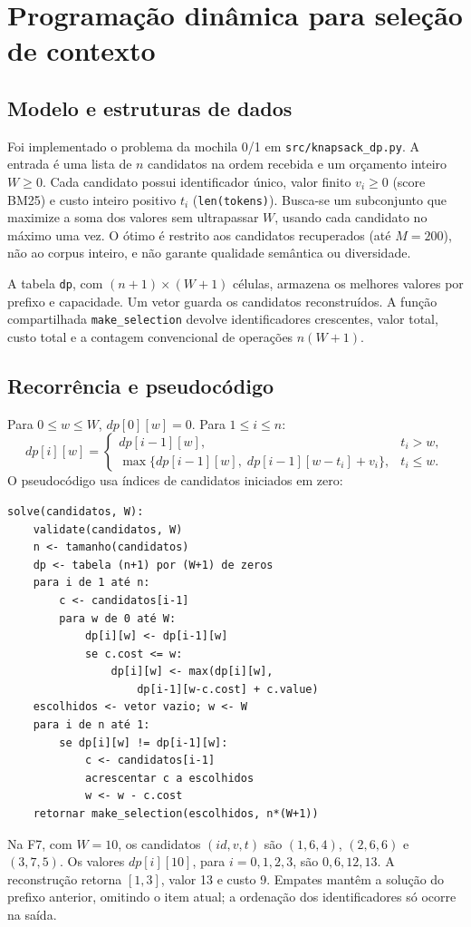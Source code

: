 \section{Programação dinâmica para seleção de contexto}

\subsection{Modelo e estruturas de dados}
Foi implementado o problema da mochila 0/1 em \texttt{src/knapsack\_dp.py}. A entrada é uma lista de $n$ candidatos na ordem recebida e um orçamento inteiro $W\geq 0$. Cada candidato possui identificador único, valor finito $v_i\geq 0$ (score BM25) e custo inteiro positivo $t_i$ (\texttt{len(tokens)}). Busca-se um subconjunto que maximize a soma dos valores sem ultrapassar $W$, usando cada candidato no máximo uma vez. O ótimo é restrito aos candidatos recuperados (até $M=200$), não ao corpus inteiro, e não garante qualidade semântica ou diversidade.

A tabela \texttt{dp}, com $(n+1)\times(W+1)$ células, armazena os melhores valores por prefixo e capacidade. Um vetor guarda os candidatos reconstruídos. A função compartilhada \texttt{make\_selection} devolve identificadores crescentes, valor total, custo total e a contagem convencional de operações $n(W+1)$.

\subsection{Recorrência e pseudocódigo}
Para $0\leq w\leq W$, $dp[0][w]=0$. Para $1\leq i\leq n$:
\[
dp[i][w]=
\begin{cases}
dp[i-1][w], & t_i>w,\\
\max\{dp[i-1][w],\;dp[i-1][w-t_i]+v_i\}, & t_i\leq w.
\end{cases}
\]
O pseudocódigo usa índices de candidatos iniciados em zero:
\begin{verbatim}
solve(candidatos, W):
    validate(candidatos, W)
    n <- tamanho(candidatos)
    dp <- tabela (n+1) por (W+1) de zeros
    para i de 1 até n:
        c <- candidatos[i-1]
        para w de 0 até W:
            dp[i][w] <- dp[i-1][w]
            se c.cost <= w:
                dp[i][w] <- max(dp[i][w],
                    dp[i-1][w-c.cost] + c.value)
    escolhidos <- vetor vazio; w <- W
    para i de n até 1:
        se dp[i][w] != dp[i-1][w]:
            c <- candidatos[i-1]
            acrescentar c a escolhidos
            w <- w - c.cost
    retornar make_selection(escolhidos, n*(W+1))
\end{verbatim}
Na F7, com $W=10$, os candidatos $(id,v,t)$ são $(1,6,4)$, $(2,6,6)$ e $(3,7,5)$. Os valores $dp[i][10]$, para $i=0,1,2,3$, são $0,6,12,13$. A reconstrução retorna $[1,3]$, valor 13 e custo 9. Empates mantêm a solução do prefixo anterior, omitindo o item atual; a ordenação dos identificadores só ocorre na saída.


